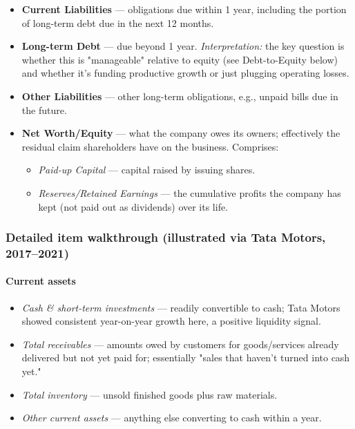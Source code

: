 \documentclass[12pt,openany]{book}
\begin{document}
\begin{itemize}[leftmargin=*]
    \item \textbf{Current Liabilities} --- obligations due within 1 year, including the portion of long-term debt due in the next 12 months.
    \item \textbf{Long-term Debt} --- due beyond 1 year. \emph{Interpretation:} the key question is whether this is "manageable" relative to equity (see Debt-to-Equity below) and whether it's funding productive growth or just plugging operating losses.
    \item \textbf{Other Liabilities} --- other long-term obligations, e.g., unpaid bills due in the future.
    \item \textbf{Net Worth/Equity} --- what the company owes its owners; effectively the residual claim shareholders have on the business. Comprises:
\begin{itemize}[leftmargin=*]
    \item \emph{Paid-up Capital} --- capital raised by issuing shares.
    \item \emph{Reserves/Retained Earnings} --- the cumulative profits the company has kept (not paid out as dividends) over its life.
\end{itemize}
\end{itemize}

\subsubsection{Detailed item walkthrough (illustrated via Tata Motors, 2017--2021)}

\paragraph{Current assets} 

\begin{itemize}[leftmargin=*]
    \item \emph{Cash \& short-term investments} --- readily convertible to cash; Tata Motors showed consistent year-on-year growth here, a positive liquidity signal.
    \item \emph{Total receivables} --- amounts owed by customers for goods/services already delivered but not yet paid for; essentially "sales that haven't turned into cash yet."
    \item \emph{Total inventory} --- unsold finished goods plus raw materials.
    \item \emph{Other current assets} --- anything else converting to cash within a year.
\end{itemize}
\end{document}
